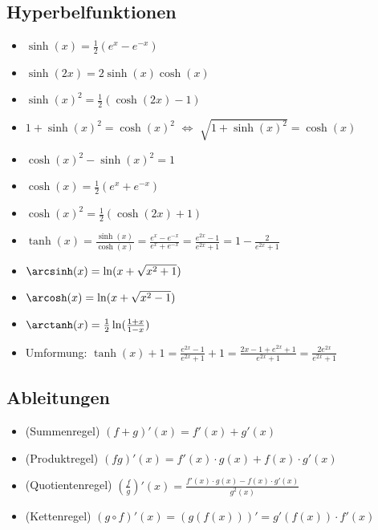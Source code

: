 \subsection{Hyperbelfunktionen}
\begin{itemize}[leftmargin=*]
	\item $\sinh(x) = \frac{1}{2}(e^x - e^{-x})$
	\item $\sinh(2x) = 2 \sinh(x) \cosh(x)$
	\item $\sinh(x)^2 = \frac{1}{2} (\cosh(2x) - 1)$
	\item $1 + \sinh(x)^2 = \cosh(x)^2$ $\Leftrightarrow$ $\sqrt{1 + \sinh(x)^2} = \cosh(x)$
	\item $\cosh(x)^2 - \sinh(x)^2 = 1$
	\item $\cosh(x) = \frac{1}{2}(e^x + e^{-x})$
	\item $\cosh(x)^2 = \frac{1}{2} (\cosh(2x) + 1)$
	\item $\tanh(x) = \frac{\sinh(x)}{\cosh(x)} = \frac{e^x - e^{-x}}{e^x +
	e^{-x}} = \frac{e^{2x} - 1}{e^{2x} + 1} = 1 - \frac{2}{e^{2x} + 1}$
	\item $\arcsinh(x) = \ln(x + \sqrt{x^2 + 1})$
	\item $\arcosh(x) = \ln(x + \sqrt{x^2 - 1})$
	\item $\arctanh(x) = \frac{1}{2} \ln(\frac{1+x}{1-x})$
	\item Umformung: $\tanh(x) + 1 = \frac{e^{2x} - 1}{e^{2x} + 1} + 1 = \frac{2x -
	1 + e^{2x} + 1}{e^{2x} + 1} = \frac{2e^{2x}}{e^{2x} + 1}$
\end{itemize}


\subsection{Ableitungen}
{\small
\begin{itemize}[leftmargin=*]
	\item (Summenregel) $(f + g)'(x) = f'(x) + g'(x)$
	\item (Produktregel) $(fg)'(x) = f'(x) \cdot g(x) + f(x) \cdot g'(x)$
	\item (Quotientenregel) $(\frac{f}{g})'(x) = \frac{f'(x) \cdot g(x) -
	f(x) \cdot g'(x)}{g^2(x)}$
	\item (Kettenregel) $(g \circ f)'(x) = (g(f(x)))' = g'(f(x)) \cdot f'(x)$
\end{itemize}}

